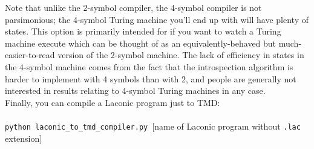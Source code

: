 \documentclass[11pt]{article}
\begin{document}
Note that unlike the 2-symbol compiler, the 4-symbol compiler is not parsimonious; the 4-symbol Turing machine you'll end up with will have plenty of states. This option is primarily intended for if you want to watch a Turing machine execute which can be thought of as an equivalently-behaved but much-easier-to-read version of the 2-symbol machine. The lack of efficiency in states in the 4-symbol machine comes from the fact that the introspection algorithm is harder to implement with 4 symbols than with 2, and people are generally not interested in results relating to 4-symbol Turing machines in any case. \\

Finally, you can compile a Laconic program just to TMD: \\ \\
\texttt{python laconic_to_tmd_compiler.py }[name of Laconic program without \texttt{.lac} extension]
\end{document}
